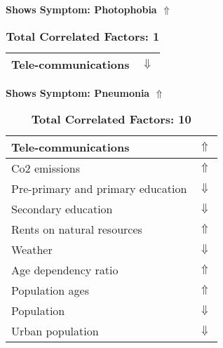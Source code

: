 \documentclass[12pt,notitlepage,oneside]{report}
\begin{document}
\begin{table}[!htb]
\caption{\textbf{Shows Symptom: Photophobia $\Uparrow$}}
\centering
\label{Correlated Socio-economic Factors0}
\begin{tabular}{|l|l|}
\hline
Tele-communications & $\Downarrow$\\ \hline
\end{tabular}
\caption*{\textbf{Total Correlated Factors: 1}}
\end{table}
\begin{table}[!htb]
\caption{\textbf{Shows Symptom: Pneumonia $\Uparrow$}}
\centering
\label{Correlated Socio-economic Factors0}
\begin{tabular}{|l|l|}
\hline
Tele-communications & $\Uparrow$\\ \hline
Co2 emissions & $\Uparrow$\\ \hline
Pre-primary and primary education & $\Downarrow$\\ \hline
Secondary education & $\Downarrow$\\ \hline
Rents on natural resources & $\Uparrow$\\ \hline
Weather & $\Downarrow$\\ \hline
Age dependency ratio & $\Uparrow$\\ \hline
Population ages & $\Uparrow$\\ \hline
Population & $\Downarrow$\\ \hline
Urban population & $\Downarrow$\\ \hline
\end{tabular}
\caption*{\textbf{Total Correlated Factors: 10}}
\end{table}
\end{document}
